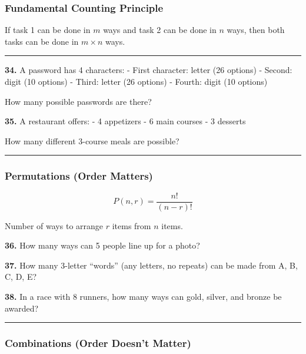 \documentclass[
  11pt,
]{article}
\begin{document}
\hypertarget{fundamental-counting-principle}{%
\subsubsection{Fundamental Counting
Principle}\label{fundamental-counting-principle}}

If task 1 can be done in \(m\) ways and task 2 can be done in \(n\)
ways, then both tasks can be done in \(m \times n\) ways.

\begin{center}\rule{0.5\linewidth}{0.5pt}\end{center}

\textbf{34.} A password has 4 characters: - First character: letter (26
options) - Second: digit (10 options) - Third: letter (26 options) -
Fourth: digit (10 options)

How many possible passwords are there?

\textbf{35.} A restaurant offers: - 4 appetizers - 6 main courses - 3
desserts

How many different 3-course meals are possible?

\begin{center}\rule{0.5\linewidth}{0.5pt}\end{center}

\hypertarget{permutations-order-matters}{%
\subsubsection{Permutations (Order
Matters)}\label{permutations-order-matters}}

\[P(n, r) = \frac{n!}{(n-r)!}\]

Number of ways to arrange \(r\) items from \(n\) items.

\textbf{36.} How many ways can 5 people line up for a photo?

\textbf{37.} How many 3-letter ``words'' (any letters, no repeats) can
be made from A, B, C, D, E?

\textbf{38.} In a race with 8 runners, how many ways can gold, silver,
and bronze be awarded?

\begin{center}\rule{0.5\linewidth}{0.5pt}\end{center}

\hypertarget{combinations-order-doesnt-matter}{%
\subsubsection{Combinations (Order Doesn't
Matter)}\label{combinations-order-doesnt-matter}}
\end{document}
